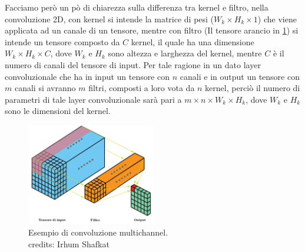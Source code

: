 Facciamo però un pò di chiarezza sulla differenza tra kernel e filtro, nella convoluzione 2D, con kernel si intende la matrice di pesi 
($W_k \times H_k \times 1$) che viene applicata ad un canale di un tensore, mentre con filtro (Il tensore arancio in \ref{fig:multichannel_convolution}) 
si intende un tensore composto da $C$ kernel, il quale ha una dimensione $W_k \times H_k \times C$, dove $W_k$ e $H_k$ sono altezza e larghezza del kernel, 
mentre $C$ è il numero di canali del tensore di input.
Per tale ragione in un dato layer convoluzionale che ha in input un tensore con $n$ canali e in output un tensore con $m$ canali si avranno $m$ filtri, 
composti a loro vota da $n$ kernel, perciò il numero di parametri di tale layer convoluzionale sarà pari a 
$m \times n \times W_k \times H_k$, dove $W_k$ e $H_k$ sono le dimensioni del kernel.
    \begin{figure}[h]
        \centering
        \includegraphics[width=0.5\textwidth]{imgs/multichannel_convolution.png}
        \caption{Esempio di convoluzione multichannel.\\
        credits: Irhum Shafkat \cite{shafkat2018convolutional}}
        \label{fig:multichannel_convolution}
    \end{figure}


